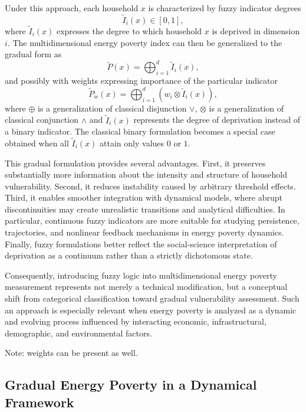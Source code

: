 \documentclass[11pt,a4paper]{article}
\begin{document}
Under this approach, each household $x$ is characterized by fuzzy indicator degrees
\[
\tilde I_{i}(x) \in [0,1],
\]
where $\tilde I_{i}(x)$ expresses the degree to which household $x$ is deprived in dimension $i$. The multidimensional energy poverty index can then be generalized to the gradual form as
\begin{equation}
\label{eq:fuzzy_mepi}
\tilde P(x) = \bigoplus_{i=1}^{d} \tilde I_{i}(x),
\end{equation}
and possibly with weights expressing importance of the particular indicator
\begin{equation}
\label{eq:fuzzy_mepi}
\tilde P_w(x) = \bigoplus_{i=1}^{d} (w_i\otimes \tilde I_{i}(x)),
\end{equation}
where $\oplus$ is a generalization of classical disjunction $\vee$, $\otimes$ is a generalization of classical conjunction $\wedge$ and $\tilde I_{i}(x)$ represents the degree of deprivation instead of a binary indicator. The classical binary formulation becomes a special case obtained when all $\tilde I_{i}(x)$ attain only values $0$ or $1$.

This gradual formulation provides several advantages. First, it preserves substantially more information about the intensity and structure of household vulnerability. Second, it reduces instability caused by arbitrary threshold effects. Third, it enables smoother integration with dynamical models, where abrupt discontinuities may create unrealistic transitions and analytical difficulties. In particular, continuous fuzzy indicators are more suitable for studying persistence, trajectories, and nonlinear feedback mechanisms in energy poverty dynamics. Finally, fuzzy formulations better reflect the social-science interpretation of deprivation as a continuum rather than a strictly dichotomous state.

Consequently, introducing fuzzy logic into multidimensional energy poverty measurement represents not merely a technical modification, but a conceptual shift from categorical classification toward gradual vulnerability assessment. Such an approach is especially relevant when energy poverty is analyzed as a dynamic and evolving process influenced by interacting economic, infrastructural, demographic, and environmental factors.

Note: weights can be present as well.

\subsection{Gradual Energy Poverty in a Dynamical Framework}
\end{document}
